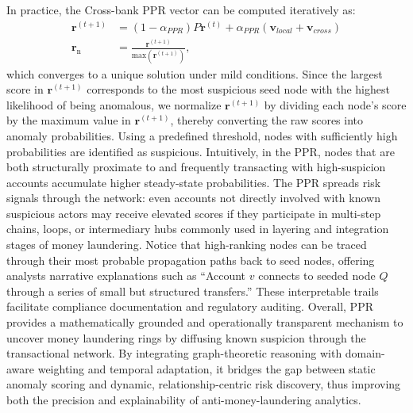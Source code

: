 In practice, the Cross-bank PPR vector can be computed iteratively as:
\begin{align}
    \boldsymbol{r}^{(t+1)} &= (1 - \alpha_{PPR})P \boldsymbol{r}^{(t)} + \alpha_{PPR} (\boldsymbol{v}_{local} + \boldsymbol{v}_{cross})  \\
    \boldsymbol{r}_{\text{n}} &= \frac{\boldsymbol{r}^{(t+1)}}{\text{max}(\boldsymbol{r}^{(t+1)})}, 
\end{align}
which converges to a unique solution under mild conditions. Since the largest score in $\boldsymbol{r}^{(t+1)}$ corresponds to the most suspicious seed node with the highest likelihood of being anomalous, we normalize $\boldsymbol{r}^{(t+1)}$ by dividing each node’s score by the maximum value in $\boldsymbol{r}^{(t+1)}$, thereby converting the raw scores into anomaly probabilities. Using a predefined threshold, nodes with sufficiently high probabilities are identified as suspicious. Intuitively, in the PPR, nodes that are both structurally proximate to and frequently transacting with high-suspicion accounts accumulate higher steady-state probabilities. The PPR spreads risk signals through the network: even accounts not directly involved with known suspicious actors may receive elevated scores if they participate in multi-step chains, loops, or intermediary hubs commonly used in layering and integration stages of money laundering. Notice that high-ranking nodes can be traced through their most probable propagation paths back to seed nodes, offering analysts narrative explanations such as “Account $v$ connects to seeded node $Q$ through a series of small but structured transfers.” These interpretable trails facilitate compliance documentation and regulatory auditing. 
Overall, PPR provides a mathematically grounded and operationally transparent mechanism to uncover money laundering rings by diffusing known suspicion through the transactional network. By integrating graph-theoretic reasoning with domain-aware weighting and temporal adaptation, it bridges the gap between static anomaly scoring and dynamic, relationship-centric risk discovery, thus improving both the precision and explainability of anti-money-laundering analytics.
 
